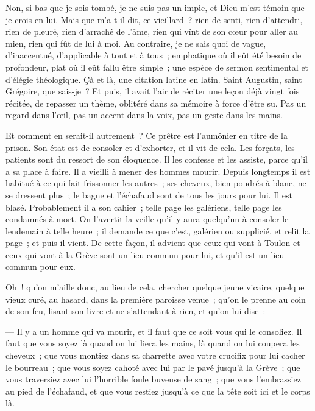 \documentclass[french,twoside]{book} %
\begin{document}
Non, si bas que je sois tombé, je ne suis pas un impie, et Dieu m’est témoin que je crois en lui. Mais que m’a-t-il dit, ce vieillard ? rien de senti, rien d’attendri, rien de pleuré, rien d’arraché de l’âme, rien qui vînt de son cœur pour aller au mien, rien qui fût de lui à moi. Au contraire, je ne sais quoi de vague, d’inaccentué, d’applicable à tout et à tous ; emphatique où il eût été besoin de profondeur, plat où il eût fallu être simple ; une espèce de sermon sentimental et d’élégie  théologique. Çà et là, une citation latine en latin. Saint Augustin, saint Grégoire, que sais-je ? Et puis, il avait l’air de réciter une leçon déjà vingt fois récitée, de repasser un thème, oblitéré dans sa mémoire à force d’être su. Pas un regard dans l’œil, pas un accent dans la voix, pas un geste dans les mains.\par
Et comment en serait-il autrement ? Ce prêtre est l’aumônier en titre de la prison. Son état est de consoler et d’exhorter, et il vit de cela. Les forçats, les patients sont du ressort de son éloquence. Il les confesse et les assiste, parce qu’il a sa place à faire. Il a vieilli à mener des hommes mourir. Depuis longtemps il est habitué à ce qui fait frissonner les autres ; ses cheveux, bien poudrés à blanc, ne se dressent plus ; le bagne et l’échafaud sont de tous les jours pour lui. Il est blasé. Probablement il a son cahier ; telle page les galériens, telle page les condamnés à mort. On l’avertit la veille qu’il y aura quelqu’un à consoler le lendemain à telle heure ; il demande ce que c’est, galérien ou supplicié, et relit la page ; et puis il vient. De cette façon, il advient que ceux qui vont à Toulon et ceux qui vont à la Grève sont un lieu commun pour lui, et qu’il est un lieu commun pour eux.\par
Oh ! qu’on m’aille donc, au lieu de cela, chercher quelque jeune vicaire, quelque vieux curé, au hasard, dans la première paroisse venue ; qu’on le prenne au coin de son feu, lisant son livre et ne s’attendant à rien, et qu’on lui dise :\par
— Il y a un homme qui va mourir, et il faut que ce soit vous qui le consoliez. Il faut que vous soyez là  quand on lui liera les mains, là quand on lui coupera les cheveux ; que vous montiez dans sa charrette avec votre crucifix pour lui cacher le bourreau ; que vous soyez cahoté avec lui par le pavé jusqu’à la Grève ; que vous traversiez avec lui l’horrible foule buveuse de sang ; que vous l’embrassiez au pied de l’échafaud, et que vous restiez jusqu’à ce que la tête soit ici et le corps là.\par
\end{document}
